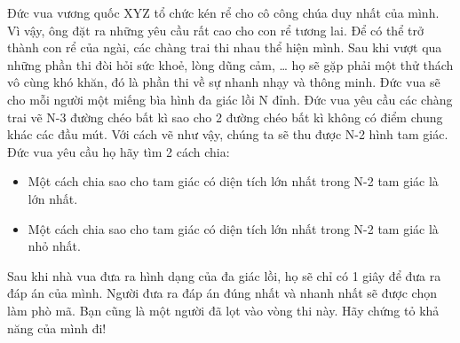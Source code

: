 Đức vua vương quốc XYZ tổ chức kén rể cho cô công chúa duy nhất của mình. Vì vậy, ông đặt ra những yêu cầu rất cao cho con rể tương lai. Để có thể trở thành con rể của ngài, các chàng trai thi nhau thể hiện mình. Sau khi vượt qua những phần thi đòi hỏi sức khoẻ, lòng dũng cảm, … họ sẽ gặp phải một thử thách vô cùng khó khăn, đó là phần thi về sự nhanh nhạy và thông minh. Đức vua sẽ cho mỗi người một miếng bìa hình đa giác lồi N đỉnh. Đức vua yêu cầu các chàng trai vẽ N-3 đường chéo bất kì sao cho 2 đường chéo bất kì không có điểm chung khác các đầu mút. Với cách vẽ như vậy, chúng ta sẽ thu được N-2 hình tam giác. Đức vua yêu cầu họ hãy tìm 2 cách chia:  
\begin{itemize}
	\item     Một cách chia sao cho tam giác có diện tích lớn nhất trong N-2 tam giác là lớn nhất.   
	\item     Một cách chia sao cho tam giác có diện tích lớn nhất trong N-2 tam giác là nhỏ nhất.   
\end{itemize}

   Sau khi nhà vua đưa ra hình dạng của đa giác lồi, họ sẽ chỉ có 1 giây để đưa ra đáp án của mình. Người đưa ra đáp án đúng nhất và nhanh nhất sẽ được chọn làm phò mã. Bạn cũng là một người đã lọt vào vòng thi này. Hãy chứng tỏ khả năng của mình đi!